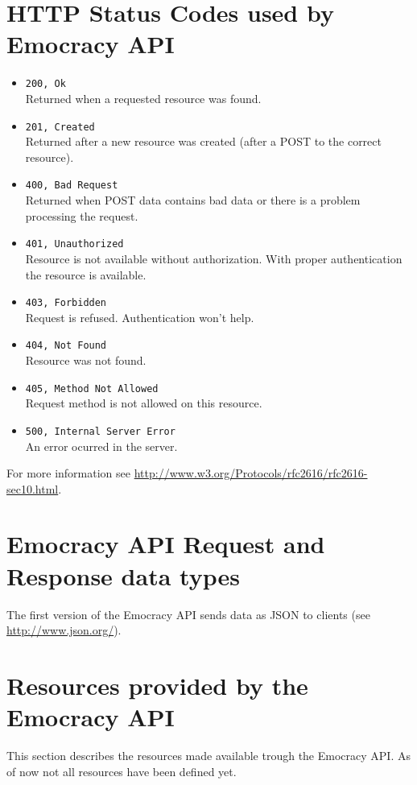 \documentclass[a4paper]{report}
\begin{document}
\section{HTTP Status Codes used by Emocracy API}
\begin{itemize}
    \item{\texttt{200, Ok}\\
    Returned when a requested resource was found.
    }
    \item{\texttt{201, Created}\\
    Returned after a new resource was created (after a POST to the correct 
    resource).
    }
    \item{\texttt{400, Bad Request}\\
    Returned when POST data contains bad data or there is a problem processing 
    the request.
    }
    \item{\texttt{401, Unauthorized}\\
    Resource is not available without authorization. With proper authentication
    the resource is available.
    }
    \item{\texttt{403, Forbidden}\\
    Request is refused. Authentication won't help.
    }
    \item{\texttt{404, Not Found}\\
    Resource was not found.
    }
    \item{\texttt{405, Method Not Allowed}\\
    Request method is not allowed on this resource.
    }
    \item{\texttt{500, Internal Server Error}\\
    An error ocurred in the server.
    }
\end{itemize}
For more information see \url{http://www.w3.org/Protocols/rfc2616/rfc2616-sec10.html}.
\section{Emocracy API Request and Response data types}
The first version of the Emocracy API sends data as JSON to clients (see \url{http://www.json.org/}). 
\section{Resources provided by the Emocracy API}
This section describes the resources made available trough the Emocracy API. As 
of now not all resources have been defined yet.
\end{document}
